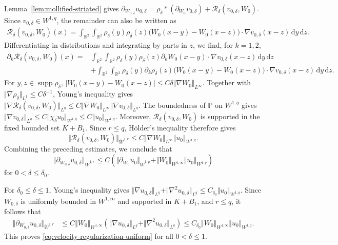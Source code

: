 \documentclass[reqno,11pt,a4paper]{amsart}
\newcommand{\dd}{\mathrm{d}}
\begin{document}
Lemma~\ref{lem:mollified-striated} gives $\partial_{W_{0,\delta}}u_{0,\delta}
  =
  \rho_\delta*(\partial_{W_0}v_{0,\delta})
  +\mathcal R_\delta(v_{0,\delta},W_0)$. 
Since $v_{0,\delta}\in W^{1,q}$,
the remainder can also be written as
\begin{align*}
  \mathcal R_\delta(v_{0,\delta},W_0)(x)
  =
  \int_{\mathbb R^2}\int_{\mathbb R^2}
  \rho_\delta(y)\rho_\delta(z)
  \bigl(W_0(x-y)-W_0(x-z)\bigr)
  \cdot\nabla v_{0,\delta}(x-z)\,\dd y\,\dd z.
\end{align*}
Differentiating in distributions and integrating by parts
in $z$, we find, for $k=1,2$,
\begin{align*}
  \partial_k\mathcal R_\delta(v_{0,\delta},W_0)(x)
  ={}&
  \int_{\mathbb R^2}\int_{\mathbb R^2}
  \rho_\delta(y)\rho_\delta(z)
  \partial_kW_0(x-y)\cdot\nabla v_{0,\delta}(x-z)
  \,\dd y\,\dd z
  \\
  &+
  \int_{\mathbb R^2}\int_{\mathbb R^2}
  \rho_\delta(y)\partial_k\rho_\delta(z)
  \bigl(W_0(x-y)-W_0(x-z)\bigr)
  \cdot\nabla v_{0,\delta}(x-z)
  \,\dd y\,\dd z.
\end{align*}
For $y,z\in\operatorname{supp}\rho_\delta$,
$|W_0(x-y)-W_0(x-z)|\leq C\delta\Vert \nabla W_0\Vert _{L^\infty}$.
Together with
$\Vert \nabla\rho_\delta\Vert _{L^1}\leq C\delta^{-1}$,
Young's inequality gives $\Vert \nabla\mathcal R_\delta(v_{0,\delta},W_0)\Vert _{L^q}
  \leq
  C\Vert \nabla W_0\Vert _{L^\infty}
  \Vert \nabla v_{0,\delta}\Vert _{L^q}$. 
The boundedness of $\mathbb P$ on $W^{1,q}$ gives
$\Vert \nabla v_{0,\delta}\Vert _{L^q}
  \leq C\Vert \chi_\delta u_0\Vert _{W^{1,q}}
  \leq C\Vert u_0\Vert _{W^{1,q}}$.
Moreover, $\mathcal R_\delta(v_{0,\delta},W_0)$
is supported in the fixed bounded set $K+B_1$.
Since $r\leq q$, H\"older's inequality therefore gives
\[
  \Vert \mathcal R_\delta(v_{0,\delta},W_0)\Vert _{\dot W^{1,r}}
  \leq
  C\Vert \nabla W_0\Vert _{L^\infty}\Vert u_0\Vert _{W^{1,q}}.
\]
Combining the preceding estimates, we conclude that
\[
  \Vert \partial_{W_{0,\delta}}u_{0,\delta}\Vert _{\dot W^{1,r}}
  \leq
  C\left(
    \Vert \partial_{W_0}u_0\Vert _{\dot W^{1,p}}
    +
    \Vert W_0\Vert _{W^{1,\infty}}\Vert u_0\Vert _{W^{1,q}}
  \right)
\]
for $0<\delta\leq\delta_0$.

For $\delta_0\leq\delta\leq1$, Young's inequality gives
$\Vert \nabla u_{0,\delta}\Vert _{L^q}+\Vert \nabla^2u_{0,\delta}\Vert _{L^q}
  \leq C_{\delta_0}\Vert u_0\Vert _{W^{1,q}}$.
Since $W_{0,\delta}$ is uniformly bounded
in $W^{1,\infty}$ and supported in $K+B_1$,
and $r\leq q$, it follows that
\begin{align*}
  \Vert \partial_{W_{0,\delta}}u_{0,\delta}\Vert _{\dot W^{1,r}}
  &\leq
  C\Vert W_0\Vert _{W^{1,\infty}}
  \left(
    \Vert \nabla u_{0,\delta}\Vert _{L^q}
    +\Vert \nabla^2u_{0,\delta}\Vert _{L^q}
  \right)
  \leq
  C_{\delta_0}\Vert W_0\Vert _{W^{1,\infty}}
  \Vert u_0\Vert _{W^{1,q}}.
\end{align*}
This proves \eqref{eq:velocity-regularization-uniform}
for all $0<\delta\leq1$.
\end{document}
